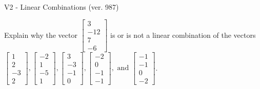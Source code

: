 \begin{exercise}
  \begin{exerciseTitle}V2 - Linear Combinations (ver. 987)\end{exerciseTitle}
  \begin{exerciseStatement}
    Explain why the vector \(\left[\begin{array}{c}
3 \\
-12 \\
7 \\
-6
\end{array}\right]\)  is or is not a linear 
	combination of the vectors \(\left[\begin{array}{c}
1 \\
2 \\
-3 \\
2
\end{array}\right] , \left[\begin{array}{c}
-2 \\
1 \\
-5 \\
1
\end{array}\right] , \left[\begin{array}{c}
3 \\
-3 \\
-1 \\
0
\end{array}\right] , \left[\begin{array}{c}
-2 \\
0 \\
-1 \\
-1
\end{array}\right] , \text{ and } \left[\begin{array}{c}
-1 \\
-1 \\
0 \\
-2
\end{array}\right]\).
	



\end{exerciseStatement}
\end{exercise}
